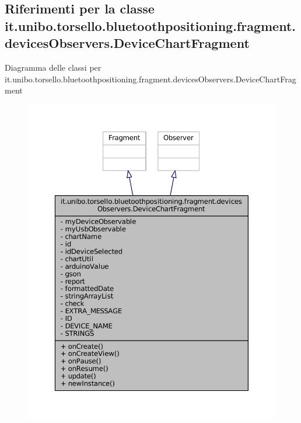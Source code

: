 \hypertarget{classit_1_1unibo_1_1torsello_1_1bluetoothpositioning_1_1fragment_1_1devicesObservers_1_1DeviceChartFragment}{}\subsection{Riferimenti per la classe it.\+unibo.\+torsello.\+bluetoothpositioning.\+fragment.\+devices\+Observers.\+Device\+Chart\+Fragment}
\label{classit_1_1unibo_1_1torsello_1_1bluetoothpositioning_1_1fragment_1_1devicesObservers_1_1DeviceChartFragment}


Diagramma delle classi per it.\+unibo.\+torsello.\+bluetoothpositioning.\+fragment.\+devices\+Observers.\+Device\+Chart\+Fragment
\nopagebreak
\begin{figure}[H]
\begin{center}
\leavevmode
\includegraphics[width=350pt]{classit_1_1unibo_1_1torsello_1_1bluetoothpositioning_1_1fragment_1_1devicesObservers_1_1DeviceChartFragment__inherit__graph}
\end{center}
\end{figure}


